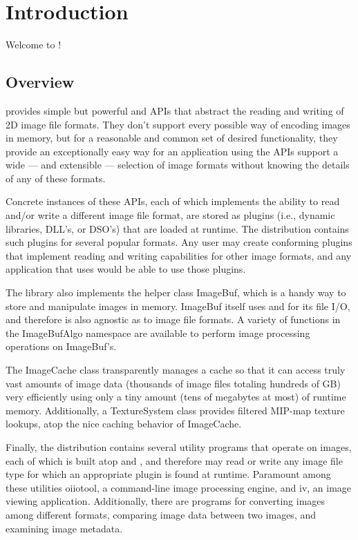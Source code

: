 \chapter{Introduction}
\label{chap:oiiointro}



Welcome to \product!

\bigskip

\section{Overview}

\product provides simple but powerful \ImageInput and \ImageOutput APIs
that abstract the reading and writing of 2D image file formats.  They
don't support every possible way of encoding images in memory, but for a
reasonable and common set of desired functionality, they provide an
exceptionally easy way for an application using the APIs support a wide
--- and extensible --- selection of image formats without knowing the
details of any of these formats.

Concrete instances of these APIs, each of which implements the ability
to read and/or write a different image file format, are stored as
plugins (i.e., dynamic libraries, DLL's, or DSO's) that are loaded at
runtime.  The \product distribution contains such plugins for several
popular formats.  Any user may create conforming plugins that implement
reading and writing capabilities for other image formats, and any
application that uses \product would be able to use those plugins.

The library also implements the helper class {\kw ImageBuf}, which is a
handy way to store and manipulate images in memory.  {\kw ImageBuf} itself
uses \ImageInput and \ImageOutput for its file I/O, and therefore is also
agnostic as to image file formats. A variety of functions in the {\cf
ImageBufAlgo} namespace are available to perform image processing operations
on {\cf ImageBuf}'s.

The {\kw ImageCache} class transparently manages a cache so that it can
access truly vast amounts of image data (thousands of image files
totaling hundreds of GB) very efficiently using only a tiny amount (tens of
megabytes at most) of runtime memory.  Additionally, a {\kw
  TextureSystem} class provides filtered MIP-map texture lookups, atop
the nice caching behavior of {\kw ImageCache}.

Finally, the \product distribution contains several utility programs
that operate on images, each of which is built atop \ImageInput and
\ImageOutput, and therefore may read or write any image file type for
which an appropriate plugin is found at runtime.  Paramount among these
utilities {\cf oiiotool}, a command-line image processing engine, and
{\fn iv}, an image viewing
application.  Additionally, there are programs for converting images
among different formats, comparing image data between two images, 
and examining image metadata.

